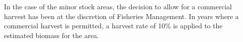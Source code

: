 In the case of the minor stock areas, the decision to allow for a commercial harvest has been at the discretion of Fisheries Management. In years where a commercial harvest is permitted, a harvest rate of 10\% is applied to the estimated biomass for the area.

	
